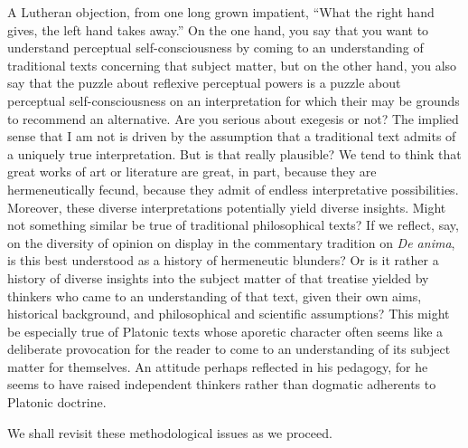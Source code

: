 A Lutheran objection, from one long grown impatient, ``What the right hand gives, the left hand takes away.'' On the one hand, you say that you want to understand perceptual self-consciousness by coming to an understanding of traditional texts concerning that subject matter, but on the other hand, you also say that the puzzle about reflexive perceptual powers is a puzzle about perceptual self-consciousness on an interpretation for which their may be grounds to recommend an alternative. Are you serious about exegesis or not? The implied sense that I am not is driven by the assumption that a traditional text admits of a uniquely true interpretation. But is that really plausible? We tend to think that great works of art or literature are great, in part, because they are hermeneutically fecund, because they admit of endless interpretative possibilities. Moreover, these diverse interpretations potentially yield diverse insights. Might not something similar be true of traditional philosophical texts? If we reflect, say, on the diversity of opinion on display in the commentary tradition on \emph{De anima}, is this best understood as a history of hermeneutic blunders? Or is it rather a history of diverse insights into the subject matter of that treatise yielded by thinkers who came to an understanding of that text, given their own aims, historical background, and philosophical and scientific assumptions? This might be especially true of Platonic texts whose aporetic character often seems like a deliberate provocation for the reader to come to an understanding of its subject matter for themselves. An attitude perhaps reflected in his pedagogy, for he seems to have raised independent thinkers rather than dogmatic adherents to Platonic doctrine.

We shall revisit these methodological issues as we proceed.

